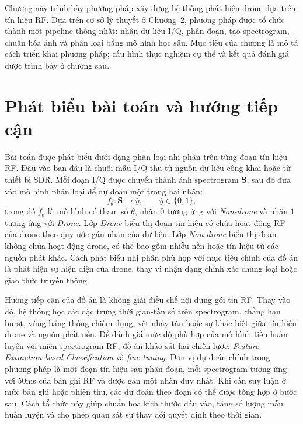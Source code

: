 \documentclass[../DoAn.tex]{subfiles}
\begin{document}
\label{chap:phuong_phap_de_xuat}

Chương này trình bày phương pháp xây dựng hệ thống phát hiện drone dựa trên tín hiệu RF. Dựa trên cơ sở lý thuyết ở Chương~2, phương pháp được tổ chức thành một pipeline thống nhất: nhận dữ liệu I/Q, phân đoạn, tạo spectrogram, chuẩn hóa ảnh và phân loại bằng mô hình học sâu. Mục tiêu của chương là mô tả cách triển khai phương pháp; cấu hình thực nghiệm cụ thể và kết quả đánh giá được trình bày ở chương sau.

\section{Phát biểu bài toán và hướng tiếp cận}

Bài toán được phát biểu dưới dạng phân loại nhị phân trên từng đoạn tín hiệu RF. Đầu vào ban đầu là chuỗi mẫu I/Q thu từ nguồn dữ liệu công khai hoặc từ thiết bị SDR. Mỗi đoạn I/Q được chuyển thành ảnh spectrogram $\mathbf{S}$, sau đó đưa vào mô hình phân loại để dự đoán một trong hai nhãn:
\begin{equation}
    f_{\theta}: \mathbf{S} \longrightarrow \hat{y},
    \qquad
    \hat{y}\in\{0,1\},
\end{equation}
trong đó $f_{\theta}$ là mô hình có tham số $\theta$, nhãn $0$ tương ứng với \textit{Non-drone} và nhãn $1$ tương ứng với \textit{Drone}. Lớp \textit{Drone} biểu thị đoạn tín hiệu có chứa hoạt động RF của drone theo quy ước gán nhãn của dữ liệu. Lớp \textit{Non-drone} biểu thị đoạn không chứa hoạt động drone, có thể bao gồm nhiễu nền hoặc tín hiệu từ các nguồn phát khác. Cách phát biểu nhị phân phù hợp với mục tiêu chính của đồ án là phát hiện sự hiện diện của drone, thay vì nhận dạng chính xác chủng loại hoặc giao thức truyền thông.

Hướng tiếp cận của đồ án là không giải điều chế nội dung gói tin RF. Thay vào đó, hệ thống học các đặc trưng thời gian-tần số trên spectrogram, chẳng hạn burst, vùng băng thông chiếm dụng, vệt nhảy tần hoặc sự khác biệt giữa tín hiệu drone và nguồn phát nền. Để đánh giá mức độ phù hợp của mô hình tiền huấn luyện với miền spectrogram RF, đồ án khảo sát hai chiến lược: \textit{Feature Extraction-based Classification} và \textit{fine-tuning}. Đơn vị dự đoán chính trong phương pháp là một đoạn tín hiệu sau phân đoạn, mỗi spectrogram tương ứng với 50ms của bản ghi RF và được gán một nhãn duy nhất. Khi cần suy luận ở mức bản ghi hoặc phiên thu, các dự đoán theo đoạn có thể được tổng hợp ở bước sau. Cách tổ chức này giúp chuẩn hóa kích thước đầu vào, tăng số lượng mẫu huấn luyện và cho phép quan sát sự thay đổi quyết định theo thời gian.
\end{document}

